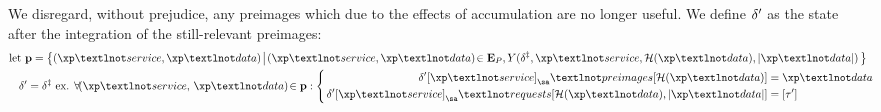We disregard, without prejudice, any preimages which due to the effects of accumulation are no longer useful. We define $\delta'$ as the state after the integration of the still-relevant preimages:
\begin{align}
  \using \mathbf{p} = \set{\build{
    \tup{\xp¬service, \xp¬data}
  }{
    \tup{\xp¬service, \xp¬data} \in \xtpreimages, Y(\accountspostxfer, \xp¬service, \blake{\xp¬data}, \len{\xp¬data})
  }}\\
  \accountspostpreimage = \accountspostxfer \text{ ex. } \forall \tup{\xp¬service,\,\xp¬data} \in \mathbf{p} : \abracegroup[\,]{
      \quad\accountspostpreimage\subb{\xp¬service}_\sa¬preimages\subb{\blake{\xp¬data}} &= \xp¬data \\
      \accountspostpreimage\subb{\xp¬service}_\sa¬requests\subb{\blake{\xp¬data}, \len{\xp¬data}} &= \sq{\thetime'}
    }\!\!\!\!
\end{align}
